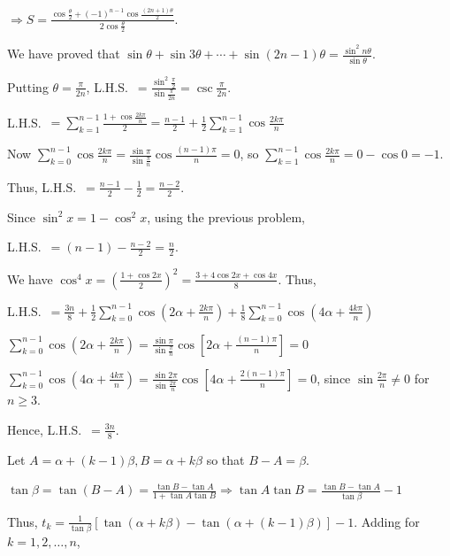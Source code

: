   $\Rightarrow S = \frac{\cos\frac{\theta}{2} + (-1)^{n - 1}\cos\frac{(2n +
      1)\theta}{2}}{2\cos\frac{\theta}{2}}$.
\item We have proved that $\sin\theta + \sin3\theta + \cdots + \sin(2n - 1)\theta =
  \frac{\sin^2n\theta}{\sin\theta}$.

  Putting $\theta = \frac{\pi}{2n}$, L.H.S.\ $= \frac{\sin^2\frac{\pi}{2}}{\sin\frac{\pi}{2n}} =
  \csc\frac{\pi}{2n}$.
\item L.H.S.\ $= \displaystyle\sum_{k = 1}^{n - 1}\frac{1 + \cos\frac{2k\pi}{n}}{2} = \frac{n - 1}{2} +
  \frac{1}{2}\displaystyle\sum_{k = 1}^{n - 1}\cos\frac{2k\pi}{n}$

  Now $\displaystyle\sum_{k = 0}^{n - 1}\cos\frac{2k\pi}{n} = \frac{\sin\pi}{\sin\frac{\pi}{n}}\cos\frac{(n -
    1)\pi}{n} = 0$, so $\displaystyle\sum_{k = 1}^{n - 1}\cos\frac{2k\pi}{n} = 0 - \cos0 = -1$.

  Thus, L.H.S.\ $= \frac{n - 1}{2} - \frac{1}{2} = \frac{n - 2}{2}$.
\item Since $\sin^2x = 1 - \cos^2x$, using the previous problem,

  L.H.S.\ $= (n - 1) - \frac{n - 2}{2} = \frac{n}{2}$.
\item We have $\cos^4x = \left(\frac{1 + \cos2x}{2}\right)^2 = \frac{3 + 4\cos2x + \cos4x}{8}$. Thus,

  L.H.S.\ $= \frac{3n}{8} + \frac{1}{2}\displaystyle\sum_{k = 0}^{n - 1}\cos\left(2\alpha +
  \frac{2k\pi}{n}\right) + \frac{1}{8}\displaystyle\sum_{k = 0}^{n - 1}\cos\left(4\alpha +
  \frac{4k\pi}{n}\right)$

  $\displaystyle\sum_{k = 0}^{n - 1}\cos\left(2\alpha + \frac{2k\pi}{n}\right) =
  \frac{\sin\pi}{\sin\frac{\pi}{n}}\cos\left[2\alpha + \frac{(n - 1)\pi}{n}\right] = 0$

  $\displaystyle\sum_{k = 0}^{n - 1}\cos\left(4\alpha + \frac{4k\pi}{n}\right) =
  \frac{\sin2\pi}{\sin\frac{2\pi}{n}}\cos\left[4\alpha + \frac{2(n - 1)\pi}{n}\right] = 0$, since
  $\sin\frac{2\pi}{n} \neq 0$ for $n \geq 3$.

  Hence, L.H.S.\ $= \frac{3n}{8}$.
\item Let $A = \alpha + (k - 1)\beta, B = \alpha + k\beta$ so that $B - A = \beta$.

  $\tan\beta = \tan(B - A) = \frac{\tan B - \tan A}{1 + \tan A\tan B} \Rightarrow \tan A\tan B = \frac{\tan
    B - \tan A}{\tan\beta} - 1$

  Thus, $t_k = \frac{1}{\tan\beta}[\tan(\alpha + k\beta) - \tan(\alpha + (k - 1)\beta)] - 1$. Adding for $k =
  1, 2, \ldots, n$,

